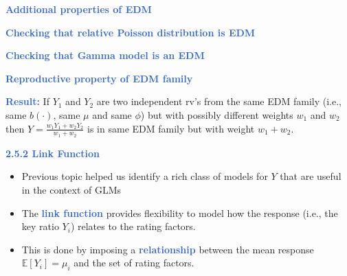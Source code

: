 \documentclass[aspectratio=169,professionalfonts,mathserif,handout]{beamer}
\newcommand{\highlight}[1]{\textcolor{Highlight}{\bf #1}}
\renewcommand{\(}{\left(}
\renewcommand{\)}{\right)}
\renewcommand{\[}{\left[}
\renewcommand{\]}{\right]}
\newcommand{\mytitle}[1]{\vspace*{-1mm}%
  \centerline{\highlight{\Large #1}}\vspace*{3mm}}
\newenvironment{slidebox}{%
  \begin{minipage}[c][7.5cm][t]{14.4cm}\raggedright}{%
  \end{minipage}}
\begin{document}
\begin{frame}\begin{slidebox}
\mytitle{Additional properties of EDM}
\end{slidebox}\end{frame}

\begin{frame}\begin{slidebox}
\mytitle{Checking that relative Poisson distribution is EDM}
\end{slidebox}\end{frame}

\begin{frame}\begin{slidebox}
\mytitle{Checking that Gamma model is an EDM}
\end{slidebox}\end{frame}

\begin{frame}\begin{slidebox}
\mytitle{Reproductive property of EDM family}

\highlight{Result:} If $Y_1$ and $Y_2$ are two independent rv's from the same EDM family (i.e., same $b(\cdot)$, same $\mu$ and same $\phi$) but with possibly different weights $w_1$ and $w_2$ then $Y = \frac{w_1Y_1+w_2Y_2}{w_1+w_2}$ is in same EDM family but with weight $w_1+w_2$.
\end{slidebox}\end{frame}

\begin{frame}\begin{slidebox}
\mytitle{2.5.2 Link Function}

\begin{itemize}
 \item Previous topic helped us identify a rich class of models for $Y$ that are useful in the context of GLMs
 \pause
 \item The \highlight{link function} provides flexibility to model how the
response (i.e., the key ratio $Y_{i}$) relates to the rating factors. 
\pause
\item  This is done by
imposing a \highlight{relationship} between the mean response $\mathbb{E}\left[
Y_{i}\right]  =\mu_{i}$ and the set of rating factors.
\end{itemize}

\end{slidebox}\end{frame}
\end{document}
